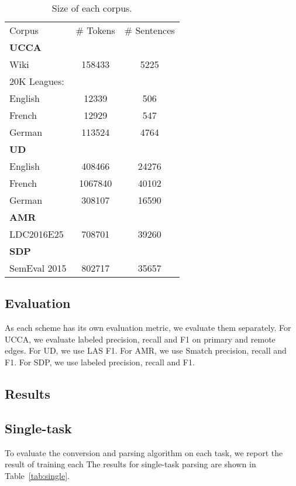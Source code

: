 \documentclass[11pt,a4paper]{article}
\begin{document}
\begin{table}
\begin{tabular}{lcc}
Corpus & \# Tokens & \# Sentences \\
\textbf{UCCA} \\
Wiki & 158433 & 5225 \\
20K Leagues: \\
English & 12339 & 506 \\
French & 12929 & 547 \\
German & 113524 & 4764 \\
\textbf{UD} \\
English & 408466 & 24276 \\
French & 1067840 & 40102 \\
German & 308107 & 16590 \\
\textbf{AMR} \\
LDC2016E25 & 708701 & 39260 \\
\textbf{SDP} \\
SemEval 2015 & 802717 & 35657 \\
\end{tabular}
\caption{Size of each corpus.\label{tab:corpora}}
\end{table}


\subsection{Evaluation}\label{sec:evaluation}

As each scheme has its own evaluation metric, we evaluate them separately.
For UCCA, we evaluate labeled precision, recall and F1 on primary and remote edges.
For UD, we use LAS F1.
For AMR, we use Smatch precision, recall and F1.
For SDP, we use labeled precision, recall and F1.


\subsection{Results}\label{sec:results}




\subsection{Single-task}\label{sec:results_single}

To evaluate the conversion and parsing algorithm on each task, we report the result
of training each 
The results for single-task parsing are shown in Table~\ref{tab:single}.
\end{document}
